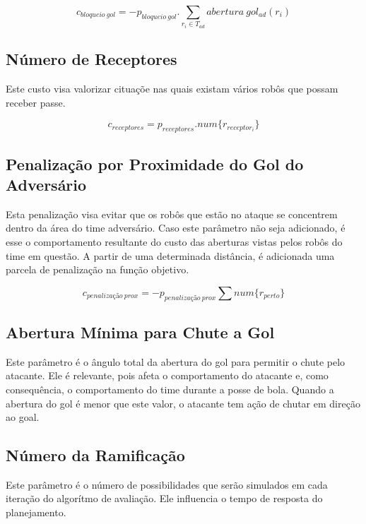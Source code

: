 \begin{dmath}
   c_{bloqueio{\ }gol} = - p_{bloqueio{\ }gol} .
    \sum_{r_i \in T_{ad}} abertura{\ }gol_{ad}(r_i)
\end{dmath}

\subsection{Número de Receptores}

Este custo visa valorizar cituaçõe nas quais existam
vários robôs que possam receber passe.

\begin{dmath}
  c_{receptores} = p_{receptores} .
   num \lbrace r_{receptor_i} \rbrace
\end{dmath}

\subsection{Penalização por Proximidade do Gol do Adversário}
Esta penalização visa evitar que os robôs que estão no ataque
se concentrem dentro da área do time adversário. Caso este
parâmetro não seja adicionado, é esse o comportamento resultante
do custo das aberturas vistas pelos robôs do time em questão. 
A partir de uma determinada distância, é adicionada uma parcela
de penalização na função objetivo.

\begin{dmath}
  c_{penalização{\ }prox} = - p_{penalização{\ }prox}
    \sum num \lbrace r_{perto} \rbrace
\end{dmath}

\subsection{Abertura Mínima para Chute a Gol}
Este parâmetro é o ângulo total da abertura do gol para permitir
o chute pelo atacante. Ele é relevante, pois afeta o comportamento
do atacante e, como consequência, o comportamento do time durante
a posse de bola. Quando a abertura do gol é menor que este valor, o
atacante tem ação de chutar em direção ao goal.


\subsection{Número da Ramificação}
Este parâmetro é o número de possibilidades que serão simulados
em cada iteração do algorítmo de avaliação. Ele influencia o
tempo de resposta do planejamento.

